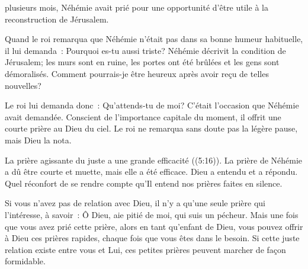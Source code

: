 \dvrule






 plusieurs mois, Néhémie avait prié
 pour une opportunité d'être utile à la reconstruction de Jérusalem.

Quand le roi remarqua que Néhémie n'était pas dans sa bonne humeur habituelle,
 il lui demanda~: \og Pourquoi es-tu aussi triste? \fg{}
 Néhémie décrivit la condition de Jérusalem; les murs sont en ruine,
 les portes ont été brûlées et les gens sont démoralisés.
 \og Comment pourrais-je être heureux après avoir reçu de telles nouvelles? \fg{}

Le roi lui demanda donc~: \og Qu'attends-tu de moi? \fg{}
 C'était l'occasion que Néhémie avait demandée.
 Conscient de l'importance capitale du moment,
 il offrit une courte prière au Dieu du ciel.
 Le roi ne remarqua sans doute pas la légère pause, mais Dieu la nota.


\og La prière agissante du juste a une grande efficacité \fg{}
 ((5:16)).
 La prière de Néhémie a dû être courte et muette, mais elle a été efficace.
 Dieu a entendu et a répondu.
 Quel réconfort de se rendre compte qu'Il entend nos prières faites en silence.

Si vous n'avez pas de relation avec Dieu, il n'y a qu'une seule prière
 qui l'intéresse, à savoir~:
 \og Ô Dieu, aie pitié de moi, qui suis un pécheur. \fg{}
 Mais une fois que vous avez prié cette prière, alors en tant qu'enfant de Dieu,
 vous pouvez offrir à Dieu ces prières rapides,
 chaque fois que vous êtes dans le besoin.
 Si cette juste relation existe entre vous et Lui,
 ces petites prières peuvent marcher de façon formidable. 

\dvrule



